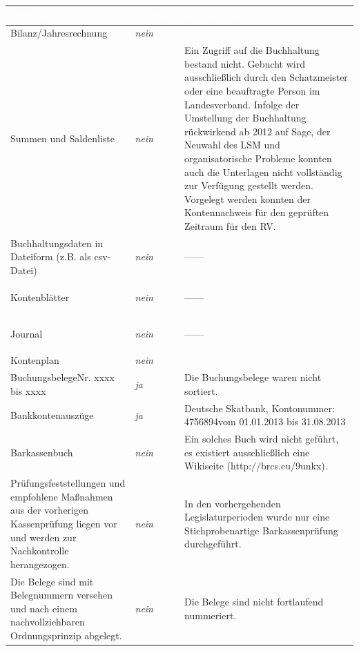 \documentclass[%
	titlepage,oneside,12pt,headlines=1.5,numbers=noenddot, chapterprefix=false,parskip=full-,DIV=14,pagesize]{scrreprt}
\newcommand*{\ditto}{\begin{center}\vspace{-0.40in}---\quad \textquotedbl\quad ---\vspace{-0.24in}\end{center}}
\begin{document}
\begin{longtable}[ht]{|p{} p{} p{}|}
\hline\rowcolor{pirateorange} 
	\textcolor{white}{\textbf{Prüfung}} & \textcolor{white}{\textbf{Ja/Nein}} & \textcolor{white}{\textbf{Kommentar}}\\\endhead
        \footnotesize Bilanz/Jahresrechnung & \footnotesize \textit{nein} & \footnotesize  \\ 
        \footnotesize Summen und Saldenliste & \footnotesize \textit{nein} & \scriptsize Ein Zugriff auf die Buchhaltung bestand nicht. Gebucht wird ausschließlich durch den Schatzmeister oder eine beauftragte Person im Landesverband. Infolge der Umstellung der Buchhaltung rückwirkend ab 2012 auf Sage, der Neuwahl des LSM und organisatorische Probleme konnten auch die Unterlagen nicht vollständig zur Verfügung gestellt werden. Vorgelegt werden konnten der Kontennachweis für den geprüften Zeitraum für den RV. \\
        \footnotesize Buchhaltungsdaten in Dateiform (z.B. als csv-Datei) & \footnotesize \textit{nein} & \ditto  \\
        \footnotesize Kontenblätter & \footnotesize \textit{nein} &  \ditto \\
        \footnotesize Journal & \footnotesize \textit{nein} & \ditto \\
        \footnotesize Kontenplan & \footnotesize \textit{nein} & \footnotesize  \\
        \footnotesize Buchungsbelege\newline Nr. xxxx bis xxxx & \footnotesize \textit{ja} & \footnotesize Die Buchungsbelege waren nicht sortiert. \\
        \footnotesize Bankkontenauszüge & \footnotesize \textit{ja} & \footnotesize Deutsche Skatbank, Kontonummer: 4756894\newline vom 01.01.2013 bis 31.08.2013 \\
        \footnotesize Barkassenbuch & \footnotesize \textit{nein} & \footnotesize Ein solches Buch wird nicht geführt, es existiert ausschließlich eine Wikiseite (http://brcs.eu/9unkx). \\
        \footnotesize Prüfungsfeststellungen und empfohlene Maßnahmen aus der vorherigen Kassenprüfung liegen vor und werden zur Nachkontrolle herangezogen. & \footnotesize \textit{nein} & \footnotesize In den vorhergehenden Legislaturperioden wurde nur eine Stichprobenartige Barkassenprüfung durchgeführt.\\
        \footnotesize Die Belege sind mit Belegnummern versehen und nach einem nachvollziehbaren Ordnungsprinzip abgelegt. & \footnotesize \textit{nein} & \footnotesize Die Belege sind nicht fortlaufend nummeriert. \\
\hline
\end{longtable}
\end{document}
